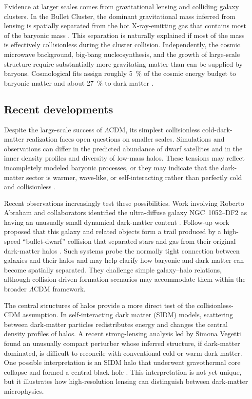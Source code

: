 Evidence at larger scales comes from gravitational lensing and colliding galaxy clusters.
In the Bullet Cluster, the dominant gravitational mass inferred from lensing is spatially separated from the hot X-ray-emitting gas that contains most of the baryonic mass \cite{Clowe_2006}.
This separation is naturally explained if most of the mass is effectively collisionless during the cluster collision.
Independently, the cosmic microwave background, big-bang nucleosynthesis, and the growth of large-scale structure require substantially more gravitating matter than can be supplied by baryons.
Cosmological fits assign roughly \SI{5}{\%} of the cosmic energy budget to baryonic matter and about \SI{27}{\%} to dark matter \cite{ade2016planck}.

\subsection{Recent developments}

Despite the large-scale success of $\Lambda$CDM, its simplest collisionless cold-dark-matter realization faces open questions on smaller scales.
Simulations and observations can differ in the predicted abundance of dwarf satellites and in the inner density profiles and diversity of low-mass halos.
These tensions may reflect incompletely modeled baryonic processes, or they may indicate that the dark-matter sector is warmer, wave-like, or self-interacting rather than perfectly cold and collisionless \cite{Vegetti2026_ChallengeCDMWDM}.

Recent observations increasingly test these possibilities.
Work involving Roberto Abraham and collaborators identified the ultra-diffuse galaxy NGC~1052--DF2 as having an unusually small dynamical dark-matter content \cite{vanDokkum2018_DarkMatterDeficient}.
Follow-up work proposed that this galaxy and related objects form a trail produced by a high-speed ``bullet-dwarf'' collision that separated stars and gas from their original dark-matter halos \cite{vanDokkum2022_BulletDwarfTrail}.
Such systems probe the normally tight connection between galaxies and their halos and may help clarify how baryonic and dark matter can become spatially separated.
They challenge simple galaxy--halo relations, although collision-driven formation scenarios may accommodate them within the broader $\Lambda$CDM framework.

The central structures of halos provide a more direct test of the collisionless-CDM assumption.
In self-interacting dark matter (SIDM) models, scattering between dark-matter particles redistributes energy and changes the central density profiles of halos.
A recent strong-lensing analysis led by Simona Vegetti found an unusually compact perturber whose inferred structure, if dark-matter dominated, is difficult to reconcile with conventional cold or warm dark matter.
One possible interpretation is an SIDM halo that underwent gravothermal core collapse and formed a central black hole \cite{Vegetti2026_ChallengeCDMWDM}.
This interpretation is not yet unique, but it illustrates how high-resolution lensing can distinguish between dark-matter microphysics.

